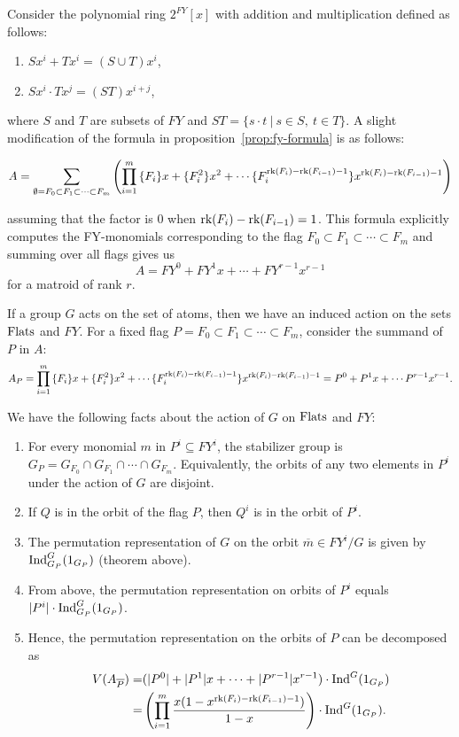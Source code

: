 \documentclass[10pt]{article}
\newcommand{\ind}{\text{\normalfont Ind}}
\newcommand{\rank}{\normalfont\text{rk}}
\newcommand{\flats}{\normalfont\text{Flats}}
\theoremstyle{remark}
\begin{document}
\hrulefill

Consider the polynomial ring $2^{FY}[x]$ with addition and multiplication defined as follows:
\begin{enumerate}
    \item $Sx^i + Tx^i = (S\cup T)x^i$,
    \item $Sx^i\cdot Tx^j = (ST)x^{i+j}$,
\end{enumerate}
where $S$ and $T$ are subsets of $FY$ and $ST=\{s\cdot t\ |\ s\in S,\ t\in T\}$.
A slight modification of the formula in proposition~\ref{prop:fy-formula} is as follows:

\begin{equation}
    \label{eqn:modH}
    A = \sum_{\emptyset = F_0\subset F_1\subset \cdots\subset F_m}{\left(\prod_{i=1}^m{
        \{F_i\}x + \{F_i^2\}x^2+ \cdots \{F_i^{\rank(F_i)-\rank(F_{i-1})-1}\}x^{\rank(F_i)-\rank(F_{i-1})-1}
    }\right)}
\end{equation}

assuming that the factor is 0 when $\rank(F_i)-\rank(F_{i-1}) = 1$. This formula explicitly computes
the FY-monomials corresponding to the flag $F_0\subset F_1\subset \cdots\subset F_m$ and summing over all flags gives us
$$A = FY^0 + FY^1x + \cdots + FY^{r-1}x^{r-1}$$
for a matroid of rank $r$.

\hrulefill

If a group $G$ acts on the set of atoms, then we have an induced action on the sets $\flats$ and $FY$.
For a fixed flag $P = F_0\subset F_1\subset \cdots\subset F_m$, consider the summand of $P$ in $A$:
    $$A_P = 
    \prod_{i=1}^m{
        \{F_i\}x + \{F_i^2\}x^2+ \cdots \{F_i^{\rank(F_i)-\rank(F_{i-1})-1}\}x^{\rank(F_i)-\rank(F_{i-1})-1}
    } = P^0 + P^1x+\cdots P^{r-1}x^{r-1}.$$

We have the following facts about the action of $G$ on $\flats$ and $FY$:
\begin{enumerate}
    \item For every monomial $m$ in $P^i\subseteq FY^i$, the stabilizer group is $G_P=
        G_{F_0}\cap G_{F_1}\cap \cdots\cap G_{F_m}$.
        Equivalently, the orbits of any two elements in $P^i$ under the action of $G$ are disjoint.
    \item If $Q$ is in the orbit of the flag $P$, then $Q^i$ is in the orbit of $P^i$.
    \item The permutation representation of $G$ on the orbit $\overline{m}\in FY^i/G$ is
        given by $\ind_{G_P}^G(1_{G_P})$ (theorem above).
    \item From above, the permutation representation on orbits of $P^i$ equals $|P^i|\cdot\ind_{G_P}^G(1_{G_P})$.
    \item Hence, the permutation representation on the orbits of $P$ can be decomposed as
        \begin{align*}
            V(A_{\overline{P}}) =& (|P^0|+|P^1|x+\cdots+|P^{r-1}|x^{r-1})\cdot\ind^G(1_{G_P})\\
            =&\left(\prod_{i=1}^m{
                \frac{x(1-x^{\rank(F_i)-\rank(F_{i-1})-1})}{1-x}}\right)\cdot\ind^G(1_{G_P}).
        \end{align*}
\end{enumerate}
\end{document}

